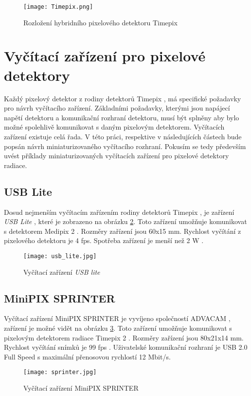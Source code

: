 \begin{figure}[h!]
 	\centering
 	\captionsetup{justification=centering}
 	\texttt{[image: Timepix.png]}
 	\caption{Rozložení hybridního pixelového detektoru Timepix \cite{Platkevic}} 
 	\label{fig:Timepix}
 \end{figure}	

\section{Vyčítací zařízení pro pixelové detektory}
\label{Vycitaci zarizeni}
Každý pixelový detektor z rodiny detektorů Timepix \cite{Llopart}, má specifické požadavky pro návrh vyčítacího zařízení. Základními požadavky, kterými jsou napájecí napětí detektoru a komunikační rozhraní detektoru, musí být splněny aby bylo možné spolehlivě komunikovat s daným pixelovým detektorem. Vyčítacích zařízení existuje celá řada. V této práci, respektive v následujících částech bude popsán návrh miniaturizovaného vyčítacího rozhraní. Pokusím se tedy především uvést příklady miniaturizovaných vyčítacích zařízení pro pixelové detektory radiace.

\subsection{USB Lite}
Dosud nejmenším vyčítacím zařízením rodiny detektorů Timepix \cite{Llopart}, je zařízení \textit{USB Lite} \cite{usb_lite}, které je zobrazeno na obrázku \ref{fig:usb_lite}. Toto zařízení umožňuje komunikovat s detektorem Medipix 2 \cite{Medpix2}. Rozměry zařízení jsou 60x15 mm. Rychlost vyčítání z pixelového detektoru je 4 fps. Spotřeba zařízení je menší než 2 W \cite{usb_lite}.
 \begin{figure}[h!]
	\centering
	\captionsetup{justification=centering}
	\texttt{[image: usb\_lite.jpg]}
	\caption{Vyčítací zařízení \textit{USB lite}} 
	\label{fig:usb_lite}
\end{figure}	

\subsection{MiniPIX SPRINTER}
Vyčítací zařízení MiniPIX SPRINTER je vyvíjeno společností ADVACAM \cite{Advacam}, zařízení je možné vidět na obrázku \ref{fig:sprinter}. Toto zařízení umožňuje komunikovat s pixelovým detektorem radiace Timepix 2 \cite{tpx2_manual}. Rozměry zařízení jsou 80x21x14 mm. Rychlost vyčítání snímků je 99 fps \cite{Advacam}. Uživatelské komunikační rozhraní je USB 2.0 Full Speed s maximální přenosovou rychlostí 12 Mbit/s.
\begin{figure}[h!]
	\centering
	\captionsetup{justification=centering}
	\texttt{[image: sprinter.jpg]}
	\caption{Vyčítací zařízení MiniPIX SPRINTER} 
	\label{fig:sprinter}
\end{figure}	

